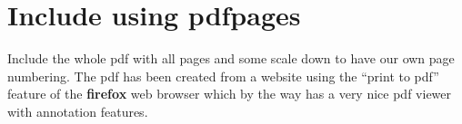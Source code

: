\chapter{Include using pdfpages}
Include the whole pdf with all pages and some scale down to have our own page numbering.
The pdf has been created from a website using the ``print to pdf'' feature of the \textbf{firefox} web browser which by the way has a very nice pdf viewer with annotation features.


